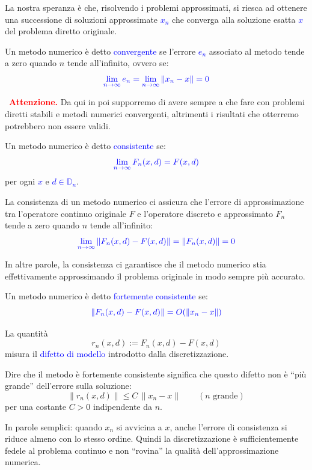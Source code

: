 La nostra speranza è che, risolvendo i problemi approssimati, si riesca ad ottenere una successione di soluzioni approssimate \textcolor{blue}{$x_n$} che converga alla soluzione esatta \textcolor{blue}{$x$} del problema diretto originale.

\begin{defi}
    Un metodo numerico è detto \textcolor{blue}{convergente} se l'errore \textcolor{blue}{$e_n$} associato al metodo
    tende a zero quando $n$ tende all'infinito, ovvero se:
    \[
        \textcolor{blue}{\lim_{n \to \infty} e_n = \lim_{n \to \infty} \|x_n - x\| = 0}
    \]
\end{defi}

\noindent\textcolor{red}{\faWarning\ \textbf{Attenzione.}} Da qui in poi supporremo di avere sempre a che fare con problemi diretti stabili e metodi numerici convergenti, altrimenti i risultati che otterremo potrebbero non essere validi.

\begin{defi}
    Un metodo numerico è detto \textcolor{blue}{consistente} se:
    \[
        \textcolor{blue}{\lim_{n \to \infty} F_n(x, d) = F(x, d)}
    \]
    per ogni \textcolor{blue}{$x$} e \textcolor{blue}{$d \in \mathbb{D}_n$}.
\end{defi}

\begin{obs}
    La consistenza di un metodo numerico ci assicura che l'errore di approssimazione tra l'operatore continuo originale $F$ e l'operatore discreto e approssimato $F_n$ tende a zero quando $n$ tende all'infinito:
    \[
        \textcolor{blue}{\lim_{n \to \infty} \|F_n(x, d) - F(x, d)\| = \|F_n(x, d)\| = 0}
    \]
\end{obs}

In altre parole, la consistenza ci garantisce che il metodo numerico stia effettivamente approssimando il problema originale in modo sempre più accurato.

\begin{defi}
    Un metodo numerico è detto \textcolor{blue}{fortemente consistente} se:
    \[
        \textcolor{blue}{\|F_n(x, d) - F(x, d)\| = O(\|x_n - x\|)}
    \]
\end{defi}

\begin{obs}
    La quantità
    \[
        r_n(x,d) := F_n(x,d)-F(x,d)
    \]
    misura il \textcolor{blue}{difetto di modello} introdotto dalla discretizzazione.

    Dire che il metodo è fortemente consistente significa che questo difetto non è ``più grande'' dell'errore sulla soluzione:
    \[
        \|r_n(x,d)\| \le C\,\|x_n-x\| \qquad (n \text{ grande})
    \]
    per una costante $C>0$ indipendente da $n$.

    In parole semplici: quando $x_n$ si avvicina a $x$, anche l'errore di consistenza si riduce almeno con lo stesso ordine. Quindi la discretizzazione è sufficientemente fedele al problema continuo e non ``rovina'' la qualità dell'approssimazione numerica.
\end{obs}

